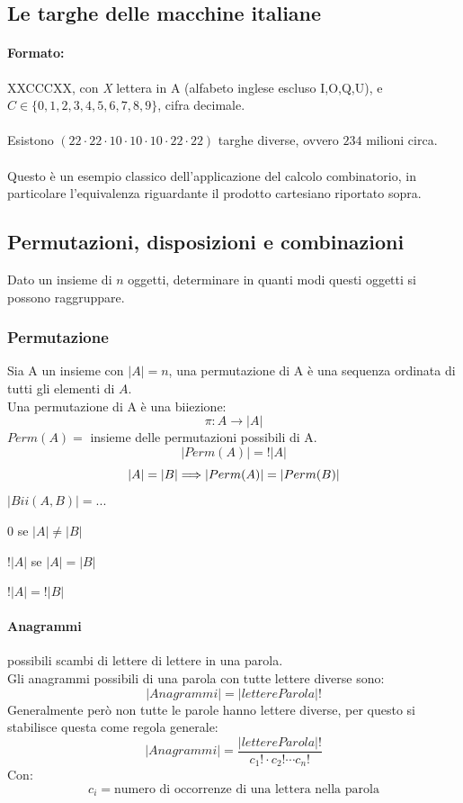 \documentclass[a4paper,12pt]{article}
\begin{document}
\subsection{Le targhe delle macchine italiane}
\paragraph{Formato: } XXCCCXX, con \emph{X} lettera in A (alfabeto inglese escluso I,O,Q,U), e \\$C \in \{0,1,2,3,4,5,6,7,8,9\}$, cifra decimale.\\\\
Esistono $(22 \cdot 22 \cdot 10 \cdot 10 \cdot 10 \cdot 22 \cdot 22)$ targhe diverse, ovvero $234$ milioni circa.\\\\
Questo è un esempio classico dell'applicazione del calcolo combinatorio, in particolare l'equivalenza riguardante il prodotto cartesiano riportato sopra.

\subsection{Permutazioni, disposizioni e combinazioni}
Dato un insieme di $n$ oggetti, determinare in quanti modi questi oggetti si possono raggruppare.
\subsubsection{Permutazione}
Sia A un insieme con $|A| = n$, una permutazione di A è una sequenza ordinata di tutti gli elementi di $A$.\\
Una permutazione di A è una biiezione:
\[
\pi: A \rightarrow |A|
\] 
$Perm(A) = $ insieme delle permutazioni possibili di A.\\
\[
|Perm(A)| = !|A|
\]
\[
|A| = |B| \Longrightarrow |Perm(A)| = |Perm(B)|\\
\]
$|Bii(A,B)| = ...$
\begin{center}
    \item $0$ se $|A| \ne |B|$
    \item $!|A|$ se $|A| = |B|$
    \item $!|A| = !|B|$
\end{center}
\paragraph{Anagrammi} possibili scambi di lettere di lettere in una parola.\\
Gli anagrammi possibili di una parola con tutte lettere diverse sono:
\[
|Anagrammi| = |lettereParola|!
\]
Generalmente però non tutte le parole hanno lettere diverse, per questo si stabilisce questa come regola generale:
\[
|Anagrammi| = \frac{|lettereParola|!}{c_1! \cdot c_2! \cdots c_n!}
\]
Con:
\[
c_i = \text{numero di occorrenze di una lettera nella parola}
\]
\end{document}
